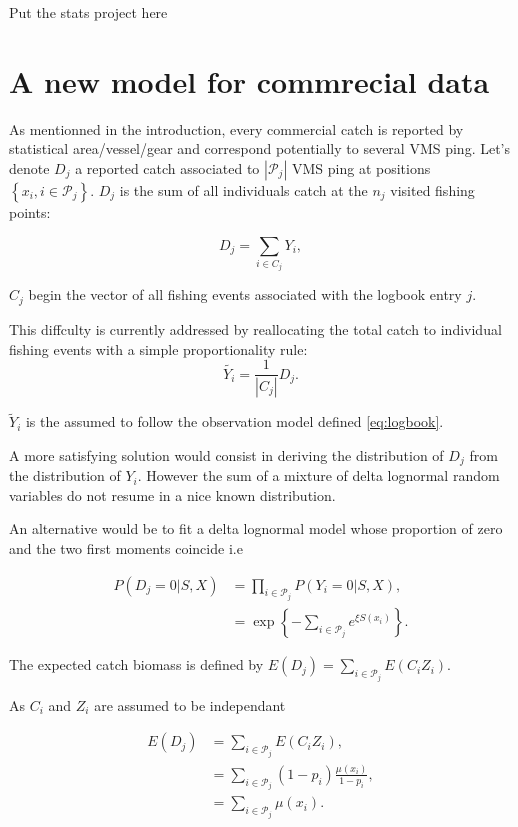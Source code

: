 \documentclass[
]{book}
\begin{document}
Put the stats project here

\hypertarget{a-new-model-for-commrecial-data}{%
\chapter{A new model for commrecial data}\label{a-new-model-for-commrecial-data}}

As mentionned in the introduction, every commercial catch is reported by statistical area/vessel/gear and correspond potentially to several VMS ping.
Let's denote \(D_j\) a reported catch associated to \(|\mathcal{P}_j|\) VMS ping at positions \(\left\lbrace x_i, i\in \mathcal{P}_j \right\rbrace\). \(D_j\) is the sum of all individuals catch at the \(n_j\) visited fishing points:

\begin{equation}
  D_{j} = \sum_{i \in  C_j} Y_i,
  \label{eq:logbook}
\end{equation}

\(C_j\) begin the vector of all fishing events associated with the logbook entry \(j\).

This diffculty is currently addressed by reallocating the total catch to individual fishing events with a simple proportionality rule:
\[\tilde{Y_i} = \frac{1}{|C_j|} D_j.\]

\(\tilde{Y}_i\) is the assumed to follow the observation model defined \eqref{eq:logbook}.

A more satisfying solution would consist in deriving the distribution of \(D_j\) from the distribution of \(Y_i\). However the sum of a mixture of delta lognormal random variables do not resume in a nice known distribution.

An alternative would be to fit a delta lognormal model whose proportion of zero and the two first moments coincide i.e

\begin{align}
P(D_j = 0 \vert S, X) & = \prod_{i\in \mathcal{P}_j} P(Y_i = 0 \vert S, X),\nonumber \\
                      & = \exp{ \left \lbrace- \sum_{i\in \mathcal{P}_j} e^{\xi S(x_i)}\right \rbrace}.
\end{align}

The expected catch biomass is defined by \(E(D_j) = \sum_{i\in \mathcal{P}_j} E(C_i Z_i).\)

As \(C_i\) and \(Z_i\) are assumed to be independant

\begin{align}
E(D_j) & = \sum_{i\in \mathcal{P}_j} E(C_i Z_i),\nonumber \\
& = \sum_{i\in \mathcal{P}_j} (1-p_i) \frac{\mu(x_i)}{1-p_i}, \nonumber \\
& = \sum_{i\in \mathcal{P}_j} \mu(x_i). \label{eq:newobs}
\end{align}
\end{document}
